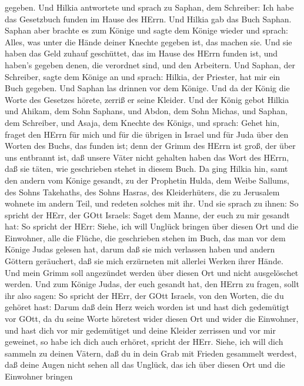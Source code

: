 gegeben.  Und Hilkia antwortete und sprach zu Saphan, dem
Schreiber: Ich habe das Gesetzbuch funden im Hause des HErrn. Und Hilkia
gab das Buch Saphan.  Saphan aber brachte es zum Könige und
sagte dem Könige wieder und sprach: Alles, was unter die Hände deiner
Knechte gegeben ist, das machen sie.  Und sie haben das
Geld zuhauf geschüttet, das im Hause des HErrn funden ist, und haben's
gegeben denen, die verordnet sind, und den Arbeitern.  Und
Saphan, der Schreiber, sagte dem Könige an und sprach: Hilkia, der
Priester, hat mir ein Buch gegeben. Und Saphan las drinnen vor dem
Könige.  Und da der König die Worte des Gesetzes hörete,
zerriß er seine Kleider.  Und der König gebot Hilkia und
Ahikam, dem Sohn Saphans, und Abdon, dem Sohn Michas, und Saphan, dem
Schreiber, und Asaja, dem Knechte des Königs, und sprach: 
Gehet hin, fraget den HErrn für mich und für die übrigen in Israel und
für Juda über den Worten des Buchs, das funden ist; denn der Grimm des
HErrn ist groß, der über uns entbrannt ist, daß unsere Väter nicht
gehalten haben das Wort des HErrn, daß sie täten, wie geschrieben stehet
in diesem Buch.  Da ging Hilkia hin, samt den andern vom
Könige gesandt, zu der Prophetin Hulda, dem Weibe Sallums, des Sohns
Takehaths, des Sohns Hasras, des Kleiderhüters, die zu Jerusalem wohnete
im andern Teil, und redeten solches mit ihr.  Und sie
sprach zu ihnen: So spricht der HErr, der GOtt Israels: Saget dem Manne,
der euch zu mir gesandt hat:  So spricht der HErr: Siehe,
ich will Unglück bringen über diesen Ort und die Einwohner, alle die
Flüche, die geschrieben stehen im Buch, das man vor dem Könige Judas
gelesen hat,  darum daß sie mich verlassen haben und andern
Göttern geräuchert, daß sie mich erzürneten mit allerlei Werken ihrer
Hände. Und mein Grimm soll angezündet werden über diesen Ort und nicht
ausgelöschet werden.  Und zum Könige Judas, der euch
gesandt hat, den HErrn zu fragen, sollt ihr also sagen: So spricht der
HErr, der GOtt Israels, von den Worten, die du gehöret hast:
 Darum daß dein Herz weich worden ist und hast dich
gedemütigt vor GOtt, da du seine Worte höretest wider diesen Ort und
wider die Einwohner, und hast dich vor mir gedemütiget und deine Kleider
zerrissen und vor mir geweinet, so habe ich dich auch erhöret, spricht
der HErr.  Siehe, ich will dich sammeln zu deinen Vätern,
daß du in dein Grab mit Frieden gesammelt werdest, daß deine Augen nicht
sehen all das Unglück, das ich über diesen Ort und die Einwohner bringen
